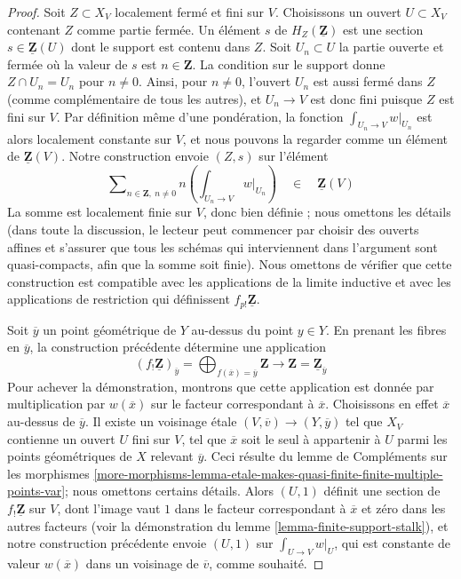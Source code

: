 \begin{proof}
\medskip\noindent
Soit $Z \subset X_V$ localement fermé et fini sur $V$.
Choisissons un ouvert $U \subset X_V$ contenant $Z$ comme partie fermée.
Un élément $s$ de $H_Z(\underline{\mathbf{Z}})$ est une section
$s \in \underline{\mathbf{Z}}(U)$ dont le support est contenu dans $Z$.
Soit $U_n \subset U$ la partie ouverte et fermée où la valeur
de $s$ est $n \in \mathbf{Z}$. La condition sur le support donne
$Z \cap U_n = U_n$ pour $n \not = 0$. Ainsi, pour $n \not = 0$, l'ouvert
$U_n$ est aussi fermé dans $Z$ (comme complémentaire de tous les autres),
et $U_n \to V$ est donc fini puisque $Z$ est fini sur $V$.
Par définition même d'une pondération, la
fonction $\int_{U_n \to V} w|_{U_n}$ est alors localement constante sur $V$,
et nous pouvons la regarder comme un élément de $\underline{\mathbf{Z}}(V)$.
Notre construction envoie $(Z, s)$ sur l'élément
$$
\sum\nolimits_{n \in \mathbf{Z},\ n \not = 0}
n \left(\int_{U_n \to V} w|_{U_n}\right)
\quad \in \quad \underline{\mathbf{Z}}(V)
$$
La somme est localement finie sur $V$, donc bien définie ; nous omettons les détails
(dans toute la discussion, le lecteur peut commencer par choisir des ouverts affines et
s'assurer que tous les schémas qui interviennent dans l'argument sont quasi-compacts, afin que
la somme soit finie). Nous omettons de vérifier que cette construction
est compatible avec les applications de la limite inductive et avec les applications de
restriction qui définissent $f_{p!}\underline{\mathbf{Z}}$.

\medskip\noindent
Soit $\overline{y}$ un point géométrique de $Y$ au-dessus du point $y \in Y$.
En prenant les fibres en $\overline{y}$, la construction précédente détermine une application
$$
(f_!\underline{\mathbf{Z}})_{\overline{y}}
= \bigoplus\nolimits_{f(\overline{x}) = \overline{y}} \mathbf{Z}
\longrightarrow
\mathbf{Z} = \underline{\mathbf{Z}}_{\overline{y}}
$$
Pour achever la démonstration, montrons que cette application est donnée par multiplication par
$w(\overline{x})$ sur le facteur correspondant à $\overline{x}$.
Choisissons en effet $\overline{x}$ au-dessus de $\overline{y}$.
Il existe un voisinage étale $(V, \overline{v}) \to (Y, \overline{y})$
tel que $X_V$ contienne un ouvert $U$ fini sur $V$,
tel que $\overline{x}$ soit le seul à appartenir à $U$ parmi les points géométriques
de $X$ relevant $\overline{y}$.
Ceci résulte du lemme de Compléments sur les morphismes
\ref{more-morphisms-lemma-etale-makes-quasi-finite-finite-multiple-points-var};
nous omettons certains détails. Alors $(U, 1)$ définit une section de
$f_!\underline{\mathbf{Z}}$ sur $V$, dont l'image vaut $1$ dans le facteur
correspondant à $\overline{x}$ et zéro dans les autres facteurs
(voir la démonstration du lemme \ref{lemma-finite-support-stalk}), et
notre construction précédente envoie $(U, 1)$ sur $\int_{U \to V} w|_U$,
qui est constante de valeur $w(\overline{x})$ dans un voisinage
de $\overline{v}$, comme souhaité.
\end{proof}

